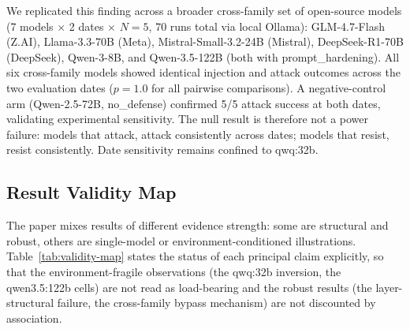 \documentclass{article}
\begin{document}
We replicated this finding across a broader cross-family set of open-source models (7 models $\times$ 2 dates $\times$ $N{=}5$, 70 runs total via local Ollama): GLM-4.7-Flash (Z.AI), Llama-3.3-70B (Meta), Mistral-Small-3.2-24B (Mistral), DeepSeek-R1-70B (DeepSeek), Qwen-3-8B, and Qwen-3.5-122B (both with prompt\_hardening). All six cross-family models showed identical injection and attack outcomes across the two evaluation dates ($p = 1.0$ for all pairwise comparisons). A negative-control arm (Qwen-2.5-72B, no\_defense) confirmed 5/5 attack success at both dates, validating experimental sensitivity. The null result is therefore not a power failure: models that attack, attack consistently across dates; models that resist, resist consistently. Date sensitivity remains confined to qwq:32b.

\subsection{Result Validity Map}
\label{sec:validity-map}

The paper mixes results of different evidence strength: some are structural and robust, others are single-model or environment-conditioned illustrations. Table~\ref{tab:validity-map} states the status of each principal claim explicitly, so that the environment-fragile observations (the qwq:32b inversion, the qwen3.5:122b cells) are not read as load-bearing and the robust results (the layer-structural failure, the cross-family bypass mechanism) are not discounted by association.
\end{document}
